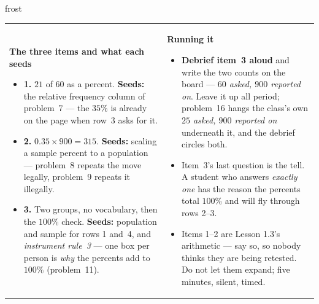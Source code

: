 \documentclass[10pt]{article}
\begin{document}
\begin{fixedskillbox}{frost}
\begin{tabularx}{\linewidth}{@{}X X@{}}
\begin{minipage}[t]{\linewidth}\vspace{0pt}
    \textbf{The three items and what each seeds}
    \begin{itemize}[leftmargin=1.1em, itemsep=1pt, topsep=2pt]
      \item \textbf{1.} $21$ of $60$ as a percent. \textbf{Seeds:} the relative frequency
            column of problem~7 --- the $35\%$ is already on the page when row~3 asks for it.
      \item \textbf{2.} $0.35 \times 900 = 315$. \textbf{Seeds:} scaling a sample percent to a
            population --- problem~8 repeats the move legally, problem~9 repeats it illegally.
      \item \textbf{3.} Two groups, no vocabulary, then the $100\%$ check. \textbf{Seeds:}
            population and sample for rows 1 and~4, and \emph{instrument rule~3} --- one box
            per person is \emph{why} the percents add to $100\%$ (problem~11).
    \end{itemize}
\end{minipage}
&
\begin{minipage}[t]{\linewidth}\vspace{0pt}
    \textbf{Running it}
    \begin{itemize}[leftmargin=1.1em, itemsep=1pt, topsep=2pt]
      \item \textbf{Debrief item~3 aloud} and write the two counts on the board --- \emph{$60$
            asked, $900$ reported on}. Leave it up all period; problem~16 hangs the class's own
            \emph{$25$ asked, $900$ reported on} underneath it, and the debrief circles both.
      \item Item~3's last question is the tell. A student who answers \emph{exactly one} has the
            reason the percents total $100\%$ and will fly through rows 2--3.
      \item Items 1--2 are Lesson 1.3's arithmetic --- say so, so nobody thinks they are being
            retested. Do not let them expand; five minutes, silent, timed.
    \end{itemize}
\end{minipage}
\end{tabularx}
\end{fixedskillbox}
\end{document}
